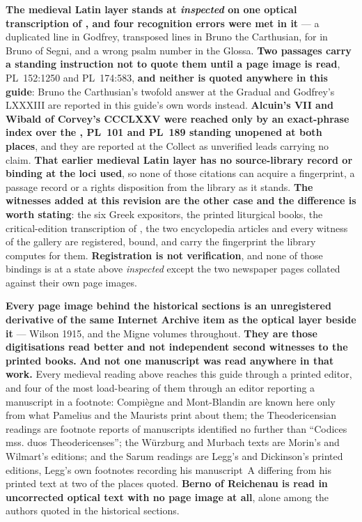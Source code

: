 \textbf{The medieval Latin layer stands at
\emph{inspected} on one optical transcription of , and
four recognition errors were met in it} --- a duplicated line in Godfrey,
transposed lines in Bruno the Carthusian,  for  in
Bruno of Segni, and a wrong psalm number in the Glossa. \textbf{Two passages
carry a standing instruction not to quote them until a page image is read},
PL~152:1250 and PL~174:583, \textbf{and neither is quoted anywhere in this
guide}: Bruno the Carthusian's twofold answer at the Gradual and Godfrey's
 LXXXIII are reported in this guide's own words instead. \textbf{Alcuin's  VII and Wibald of
Corvey's  CCCLXXV were reached only by an exact-phrase index over
the , PL~101 and PL~189 standing unopened at both
places}, and they are reported at the Collect as unverified leads carrying no
claim. \textbf{That earlier medieval Latin layer has no source-library record or
binding at the loci used}, so none of those citations can acquire a fingerprint,
a passage record or a rights disposition from the library as it stands.
\textbf{The witnesses added at this revision are the other case and the
difference is worth stating}: the six Greek expositors, the printed liturgical
books, the critical-edition transcription of , the two
encyclopedia articles and every witness of the gallery are registered, bound,
and carry the fingerprint the library computes for them. \textbf{Registration is
not verification}, and none of those bindings is at a state above
\emph{inspected} except the two newspaper pages collated against their own page
images.

\textbf{Every page image behind the historical sections is an unregistered
derivative of the same Internet Archive item as the optical layer beside it} ---
Wilson 1915, and the Migne volumes throughout. \textbf{They are those
digitisations read better and not independent second witnesses to the printed
books.} \textbf{And not one manuscript was read anywhere in that work.} Every
medieval reading above reaches this guide through a printed editor, and four of
the most load-bearing of them through an editor reporting a manuscript in a
footnote: Compiègne and Mont-Blandin are known here only from what Pamelius and
the Maurists print about them; the Theodericensian readings are footnote reports
of manuscripts identified no further than ``Codices mss. duos Theodericenses''; the
Würzburg and Murbach texts are Morin's and Wilmart's editions; and the Sarum
readings are Legg's and Dickinson's printed editions, Legg's own footnotes
recording his manuscript~A differing from his printed text at two of the places
quoted. \textbf{Berno of Reichenau is read in uncorrected optical text with no
page image at all}, alone among the authors quoted in the historical sections.

